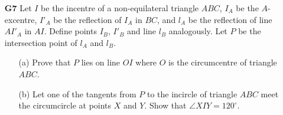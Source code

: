 \documentclass[11pt,a4paper]{article}
\begin{document}
\begin{itemize}
\item[\textbf{G7}]
Let $I$ be the incentre of a non-equilateral triangle $ABC$, $I_A$ be the $A$-excentre, $I'_A$ be the reflection of $I_A$ in $BC$, and $l_A$ be the reflection of line $AI'_A$ in $AI$. Define points $I_B$, $I'_B$ and line $l_B$ analogously. Let $P$ be the intersection point of $l_A$ and $l_B$.

\begin{itemize}
\item [(a)] Prove that $P$ lies on line $OI$ where $O$ is the circumcentre of triangle $ABC$.
\item [(b)] Let one of the tangents from $P$ to the incircle of triangle $ABC$ meet the circumcircle at points $X$ and $Y$. Show that $\angle XIY = 120^{\circ}$.
\end{itemize}


\end{itemize}
\end{document}
